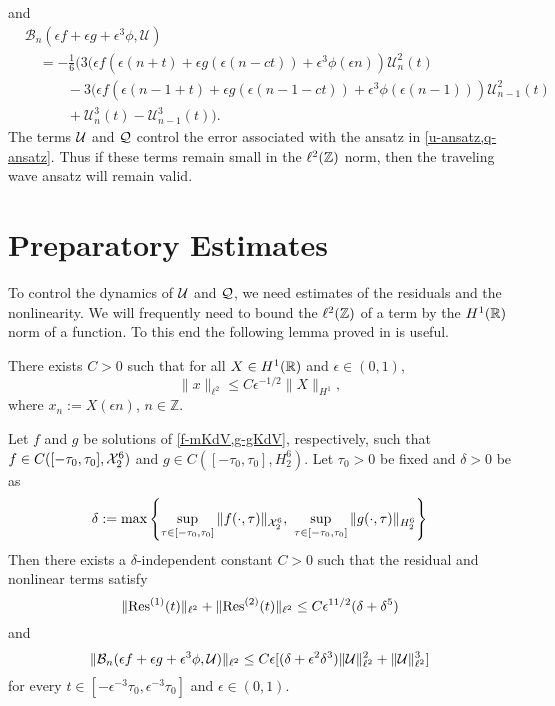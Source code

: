 and 
\begin{equation}
\begin{aligned}
	&\mathcal B_n(\epsilon f + \epsilon g + \epsilon^3 \phi, \mathcal U) \\
	&\quad= -\frac 1 6 \Big( 3(\epsilon f(\epsilon(n+t) + \epsilon g(\epsilon(n-ct)) + \epsilon^3 \phi(\epsilon n))  \mathcal U^2_n(t) \\
	&\quad \qquad - 3(\epsilon f(\epsilon(n-1+t) + \epsilon g(\epsilon(n-1-ct)) + \epsilon^3 \phi(\epsilon (n-1)))  \mathcal U^2_{n-1}(t) \\
	&\quad\qquad + \mathcal U_n^3(t)  - \mathcal U_{n-1}^3(t)\Big).
\end{aligned}
\end{equation}
The terms \(\mathcal{U}\) and \(\mathcal{Q}\) control the error associated with the ansatz in \cref{u-ansatz,q-ansatz}. Thus if these terms remain small in the \(\ell^2(\mathbb{Z})\) norm, then the traveling wave ansatz will remain valid.

\section{Preparatory Estimates}
 
To control the dynamics of \(\mathcal{U}\) and \(\mathcal{Q}\), we need estimates of the residuals and the nonlinearity. We will frequently need to bound the \(\ell^2(\mathbb{Z})\) of a term by the \(H^1(\mathbb{R})\) norm of a function. To this end the following lemma proved in \cite{dumas2014justification} is useful.
\begin{lem}\label{h1-ell2-ineq}
	There exists \(C>0\) such that for all \(X \in H^1(\mathbb{R})\) and \(\epsilon \in (0,1)\), \[\|x\|_{\ell^2} \leq C \epsilon^{-1/2} \|X\|_{H^1},\] where \(x_n := X(\epsilon n)\), \(n\in \mathbb Z\).
\end{lem}


\begin{lem}\label{residual-nonlinearity-bounds}
	Let \(f\) and \(g\) be solutions of \cref{f-mKdV,g-gKdV}, respectively, such that \(f\in C([-\tau_0, \tau_0] , \mathcal{X}^6_2)\) and \(g\in C([-\tau_0,\tau_0], H^6_2)\). Let \(\tau_0 > 0\) be fixed and \(\delta>0\) be as \begin{equation}\label{delta-defn}
		\delta := \max \left\{\sup_{\tau\in[-\tau_0, \tau_0]}\|f(\cdot,\tau)\|_{\mathcal{X}^6_2},\ \sup_{\tau\in[-\tau_0, \tau_0]} \|g(\cdot, \tau)\|_{H^6_2} \right\}
	\end{equation}
 	Then there exists a \(\delta\)-independent constant \(C>0\) such that the residual and nonlinear terms satisfy
	\begin{equation}\label{res-ineq}
		\| \mathrm{Res}^{(1)}(t) \|_{\ell^2} + \|\mathrm{Res}^{(2)}(t) \|_{\ell^2} \leq C \epsilon^{11/2} (\delta + \delta^5)
	\end{equation}
	and 
	\begin{equation}\label{nonlinear-ineq}
		\| \mathcal B_n(\epsilon f + \epsilon g + \epsilon^3 \phi, \mathcal U) \|_{\ell^2} \leq C\epsilon [ (\delta+\epsilon^2\delta^3) \|\mathcal{U}\|_{\ell^2} ^2 + \|\mathcal{U}\|_{\ell^2}^3]
	\end{equation}
	for every \(t\in[-\epsilon^{-3} \tau_0, \epsilon^{-3} \tau_0]\) and \(\epsilon \in (0,1).\)
\end{lem}

